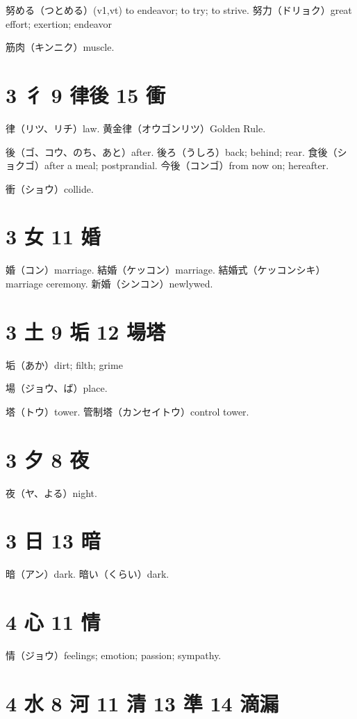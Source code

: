 努める（つとめる）(v1,vt) to endeavor; to try; to strive.
努力（ドリョク）great effort; exertion; endeavor

筋肉（キンニク）muscle.

\section{3 彳 9 律後 15 衝}

律（リツ、リチ）law.
黄金律（オウゴンリツ）Golden Rule.

後（ゴ、コウ、のち、あと）after.
後ろ（うしろ）back; behind; rear.
食後（ショクゴ）after a meal; postprandial.
今後（コンゴ）from now on; hereafter.

衝（ショウ）collide.

\section{3 女 11 婚}

婚（コン）marriage.
結婚（ケッコン）marriage.
結婚式（ケッコンシキ）marriage ceremony.
新婚（シンコン）newlywed.

\section{3 土 9 垢 12 場塔}

垢（あか）dirt; filth; grime

場（ジョウ、ば）place.

塔（トウ）tower.
管制塔（カンセイトウ）control tower.

\section{3 夕 8 夜}

夜（ヤ、よる）night.

\section{3 日 13 暗}

暗（アン）dark.
暗い（くらい）dark.

\section{4 心 11 情}

情（ジョウ）feelings; emotion; passion; sympathy.

\section{4 水 8 河 11 清 13 準 14 滴漏}

